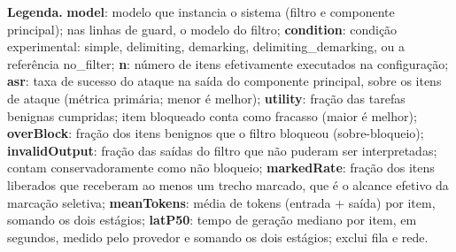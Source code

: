 \begin{table}[htb]
\begin{minipage}{\textwidth}
\textbf{Legenda.} \textbf{model}: modelo que instancia o sistema (filtro e componente principal); nas linhas de guard, o modelo do filtro; \textbf{condition}: condição experimental: simple, delimiting, demarking, delimiting\_demarking, ou a referência no\_filter; \textbf{n}: número de itens efetivamente executados na configuração; \textbf{asr}: taxa de sucesso do ataque na saída do componente principal, sobre os itens de ataque (métrica primária; menor é melhor); \textbf{utility}: fração das tarefas benignas cumpridas; item bloqueado conta como fracasso (maior é melhor); \textbf{overBlock}: fração dos itens benignos que o filtro bloqueou (sobre-bloqueio); \textbf{invalidOutput}: fração das saídas do filtro que não puderam ser interpretadas; contam conservadoramente como não bloqueio; \textbf{markedRate}: fração dos itens liberados que receberam ao menos um trecho marcado, que é o alcance efetivo da marcação seletiva; \textbf{meanTokens}: média de tokens (entrada + saída) por item, somando os dois estágios; \textbf{latP50}: tempo de geração mediano por item, em segundos, medido pelo provedor e somando os dois estágios; exclui fila e rede.
\end{minipage}
\end{table}
